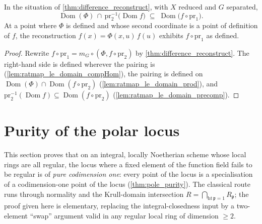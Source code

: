 \begin{theorem}
  \label{thm:difference_domain_reflection}
  \leanok
  In the situation of \ref{thm:difference_reconstruct}, with \(X\) reduced and
  \(G\) separated,
  \[
    \operatorname{Dom}(\Phi) \,\cap\,
    \mathrm{pr}_2^{-1}\bigl(\operatorname{Dom} f\bigr)
    \;\subseteq\;
    \operatorname{Dom}\bigl(f \circ \mathrm{pr}_1\bigr).
  \]
  At a point where \(\Phi\) is defined and whose second coordinate is a point of
  definition of \(f\), the reconstruction \(f(x) = \Phi(x, u)\, f(u)\) exhibits
  \(f \circ \mathrm{pr}_1\) as defined.
\end{theorem}
\begin{proof}
  \leanok
  Rewrite \(f \circ \mathrm{pr}_1 = m_G \circ (\Phi, f \circ \mathrm{pr}_2)\)
  by \ref{thm:difference_reconstruct}. The right-hand side is defined wherever
  the pairing is (\ref{lem:ratmap_le_domain_compHom}), the pairing is defined on
  \(\operatorname{Dom}(\Phi) \cap \operatorname{Dom}(f \circ \mathrm{pr}_2)\)
  (\ref{lem:ratmap_le_domain_prod}), and
  \(\mathrm{pr}_2^{-1}(\operatorname{Dom} f) \subseteq
  \operatorname{Dom}(f \circ \mathrm{pr}_2)\)
  (\ref{lem:ratmap_le_domain_precomp}).
\end{proof}

\section{Purity of the polar locus}
\label{sec:pole_purity}

This section proves that on an integral, locally Noetherian scheme whose local
rings are all regular, the locus where a fixed element of the function field
fails to be regular is of \emph{pure codimension one}: every point of the locus
is a specialisation of a codimension-one point of the locus
(\ref{thm:pole_purity}). The classical route runs through normality and the
Krull-domain intersection \(R = \bigcap_{\mathrm{ht}\,\mathfrak p = 1}
R_{\mathfrak p}\); the proof given here is elementary, replacing the
integral-closedness input by a two-element ``swap'' argument valid in any
regular local ring of dimension \(\geq 2\).

